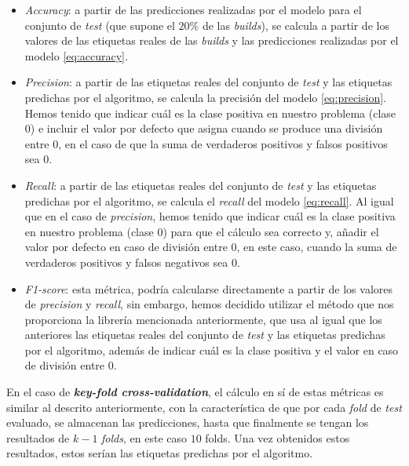 \begin{itemize}
    \item \textit{Accuracy}: a partir de las predicciones realizadas por el modelo para el
    conjunto de \textit{test} (que supone el $20\%$ de las \textit{builds}), se calcula a
    partir de los valores de las etiquetas reales de las \textit{builds} y las predicciones
    realizadas por el modelo \eqref{eq:accuracy}.\\

    \item \textit{Precision}: a partir de las etiquetas reales del conjunto de \textit{test} y
    las etiquetas predichas por el algoritmo, se calcula la precisión del modelo
    \eqref{eq:precision}. Hemos tenido que indicar cuál es la clase positiva en nuestro problema
    (clase 0) e incluir el valor por defecto que asigna cuando se produce una división entre $0$,
    en el caso de que la suma de verdaderos positivos y falsos positivos sea $0$.\\

    \item \textit{Recall}: a partir de las etiquetas reales del conjunto de \textit{test} y las
    etiquetas predichas por el algoritmo, se calcula el \textit{recall} del modelo
    \eqref{eq:recall}. Al igual que en el caso de \textit{precision}, hemos tenido que indicar
    cuál es la clase positiva en nuestro problema (clase 0) para que el cálculo sea correcto y,
    añadir el valor por defecto en caso de división entre $0$, en este caso, cuando la suma de
    verdaderos positivos y falsos negativos sea $0$.\\

    \item \textit{F1-score}: esta métrica, podría calcularse directamente a partir de los valores
    de \textit{precision} y \textit{recall}, sin embargo, hemos decidido utilizar el método que
    nos proporciona la librería mencionada anteriormente, que usa al igual que los anteriores las
    etiquetas reales del conjunto de \textit{test} y las etiquetas predichas por el algoritmo,
    además de indicar cuál es la clase positiva y el valor en caso de división entre $0$.\\
\end{itemize}

En el caso de \textbf{\textit{key-fold cross-validation}}, el cálculo en sí de estas métricas
es similar al descrito anteriormente, con la característica de que por cada \textit{fold} de
\textit{test} evaluado, se almacenan las predicciones, hasta que finalmente se tengan los
resultados de $k-1$ \textit{folds}, en este caso $10$ folds. Una vez obtenidos estos resultados,
estos serían las etiquetas predichas por el algoritmo.

